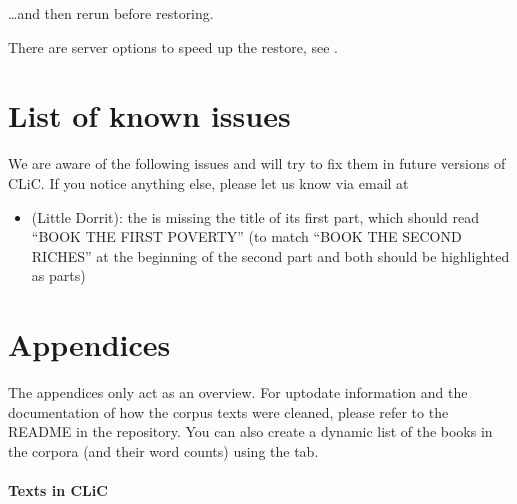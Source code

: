 \documentclass[letterpaper,10pt,english]{sphinxmanual}
\begin{document}
\sphinxAtStartPar
…and then re\sphinxhyphen{}run  before restoring.

\sphinxAtStartPar
There are server options to speed up the restore, see .

\sphinxstepscope


\chapter{List of known issues}
\label{\detokenize{known-issues:list-of-known-issues}}\label{\detokenize{known-issues::doc}}
\sphinxAtStartPar
We are aware of the following issues and will try to fix them in future versions of CLiC.
If you notice anything else, please let us know via email at 
\begin{itemize}
\item {} 
\sphinxAtStartPar
{} (Little Dorrit): the  is missing the title of its first part, which should read “BOOK THE FIRST POVERTY” (to match “BOOK THE SECOND RICHES” at the beginning of the second part \sphinxhyphen{} and both should be highlighted as parts)

\end{itemize}

\sphinxstepscope


\chapter{Appendices}
\label{\detokenize{appendices:appendices}}\label{\detokenize{appendices:a-list-of-texts-available-in-clic}}\label{\detokenize{appendices::doc}}
\sphinxAtStartPar
The appendices only act as an overview. For up\sphinxhyphen{}to\sphinxhyphen{}date information and
the documentation of how the corpus texts were cleaned, please refer to
the README in the  repository. You can also create a
dynamic list of the books in the corpora (and their word counts) using
the {\hyperref[\detokenize{clicanalysis/counts:counts}]{}} tab.
\subsubsection*{Texts in CLiC}
\end{document}
